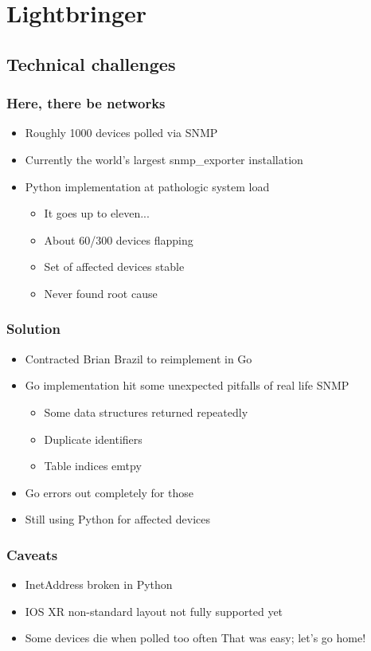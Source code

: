 \documentclass[t]{beamer}
\begin{document}
\section{Lightbringer}

\subsection{Technical challenges}

\begin{frame}
	\frametitle{Here, there be networks}
	\begin{itemize}
		\item Roughly 1000 devices polled via SNMP
		\item Currently the world's largest snmp\_exporter installation
		\item Python implementation at pathologic system load
		\begin{itemize}
			\item It goes up to eleven...
			\item About 60/300 devices flapping
			\item Set of affected devices stable
			\item Never found root cause
		\end{itemize}
	\end{itemize}
\end{frame}

\begin{frame}
	\frametitle{Solution}
	\begin{itemize}
		\item Contracted Brian Brazil to reimplement in Go
		\item Go implementation hit some unexpected pitfalls of real life SNMP
		\begin{itemize}
			\item Some data structures returned repeatedly
			\item Duplicate identifiers
			\item Table indices emtpy
		\end{itemize}
		\item Go errors out completely for those
		\item Still using Python for affected devices
	\end{itemize}
\end{frame}

\begin{frame}
	\frametitle{Caveats}
	\begin{itemize}
		\item InetAddress broken in Python
		\item IOS XR non-standard layout not fully supported yet 
		\item Some devices die when polled too often
		\vfill
			That was easy; let's go home!
	\end{itemize}
\end{frame}
\end{document}
